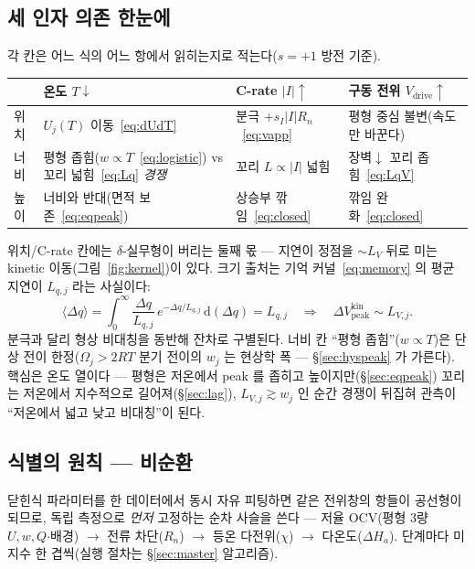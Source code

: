 \documentclass[11pt,a4paper]{article}
\newcommand{\dd}{\mathrm{d}}
\newcommand{\drive}{\mathrm{drive}}
\newcommand{\peak}{\mathrm{peak}}
\begin{document}
\subsection{세 인자 의존 한눈에}
각 칸은 어느 식의 어느 항에서 읽히는지로 적는다($s=+1$ 방전 기준).
\begin{center}
\renewcommand{\arraystretch}{1.4}
\begin{tabular}{p{} p{} p{} p{}}
\toprule
 & \textbf{온도 $T\downarrow$} & \textbf{C-rate $|I|\uparrow$} & \textbf{구동 전위 $V_\drive\uparrow$} \\
\midrule
위치 & $U_j(T)$ 이동~\eqref{eq:dUdT} & 분극 $+s_I|I|R_n$~\eqref{eq:vapp} & 평형 중심 불변(속도만 바꾼다) \\
너비 & 평형 좁힘($w\propto T$~\eqref{eq:logistic}) vs 꼬리 넓힘~\eqref{eq:Lq} \emph{경쟁} & 꼬리 $L\propto|I|$ 넓힘 & 장벽$\downarrow$ 꼬리 좁힘~\eqref{eq:LqV} \\
높이 & 너비와 반대(면적 보존~\eqref{eq:eqpeak}) & 상승부 깎임~\eqref{eq:closed} & 깎임 완화~\eqref{eq:closed} \\
\bottomrule
\end{tabular}
\end{center}
위치/C-rate 칸에는 $\delta$-실무형이 버리는 둘째 몫 — 지연이 정점을 $\sim L_V$ 뒤로 미는 kinetic 이동(그림~\ref{fig:kernel})이 있다. 크기 출처는 기억 커널~\eqref{eq:memory} 의 평균 지연이 $L_{q,j}$ 라는 사실이다:
\begin{equation}
\langle\Delta q\rangle
=\int_0^\infty\frac{\Delta q}{L_{q,j}}\,e^{-\Delta q/L_{q,j}}\,\dd(\Delta q)
=L_{q,j}
\quad\Rightarrow\quad
\Delta V_{\peak}^{\text{kin}}\sim L_{V,j}.
\label{eq:kinshift}
\end{equation}
분극과 달리 형상 비대칭을 동반해 잔차로 구별된다. 너비 칸 ``평형 좁힘''($w\propto T$)은 단상 전이 한정($\Omega_j>2RT$ 분기 전이의 $w_j$ 는 현상학 폭 — \S\ref{sec:hyspeak} 가 가른다). 핵심은 온도 열이다 — 평형은 저온에서 peak 를 좁히고 높이지만(\S\ref{sec:eqpeak}) 꼬리는 저온에서 지수적으로 길어져(\S\ref{sec:lag}), $L_{V,j}\gtrsim w_j$ 인 순간 경쟁이 뒤집혀 관측이 ``저온에서 넓고 낮고 비대칭''이 된다.

\subsection{식별의 원칙 — 비순환}
닫힌식 파라미터를 한 데이터에서 동시 자유 피팅하면 같은 전위창의 항들이 공선형이 되므로, 독립 측정으로 \emph{먼저} 고정하는 순차 사슬을 쓴다 — 저율 OCV(평형 3량 $U,w,Q$$\cdot$배경) $\to$ 전류 차단($R_n$) $\to$ 등온 다전위($\chi$) $\to$ 다온도($\Delta H_a$). 단계마다 미지수 한 겹씩(실행 절차는 \S\ref{sec:master} 알고리즘).
\end{document}
